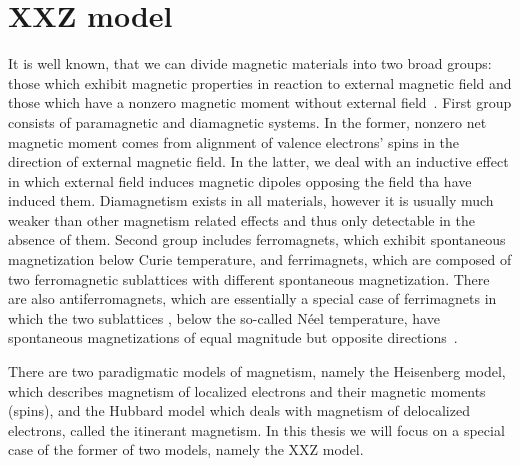 \chapter{XXZ model\label{sec:xxz}}
\thispagestyle{chapterBeginStyle}
    It is well known, that we can divide magnetic materials into two broad groups: those which
exhibit magnetic properties in reaction to external magnetic field and those which have a nonzero
magnetic moment without external field~\autocite{spalek2015}. First group consists of paramagnetic
and diamagnetic systems. In the former, nonzero net magnetic moment comes from alignment of
valence electrons' spins in the direction of external magnetic field. In the latter, we deal with
 an inductive effect in which external field induces magnetic dipoles opposing the field tha have
induced them. Diamagnetism exists in all materials, however it is usually much weaker than other magnetism related
effects and thus only detectable in the absence of them. Second group includes ferromagnets, which
exhibit spontaneous magnetization below Curie temperature, and ferrimagnets, which are 
composed of two ferromagnetic sublattices with different spontaneous magnetization. There
 are also antiferromagnets, which are essentially a special case of ferrimagnets in which the two sublattices
, below the so-called N{\'e}el temperature, have spontaneous magnetizations of equal magnitude
but opposite directions~\autocite{nolting2018theoretical}.

There are two paradigmatic models of magnetism, namely the Heisenberg model, which describes magnetism
of localized electrons and their magnetic moments (spins), and the Hubbard model which deals with
magnetism of delocalized electrons, called the itinerant magnetism. In this thesis we will focus on
a special case of the former of two models, namely the XXZ model.


